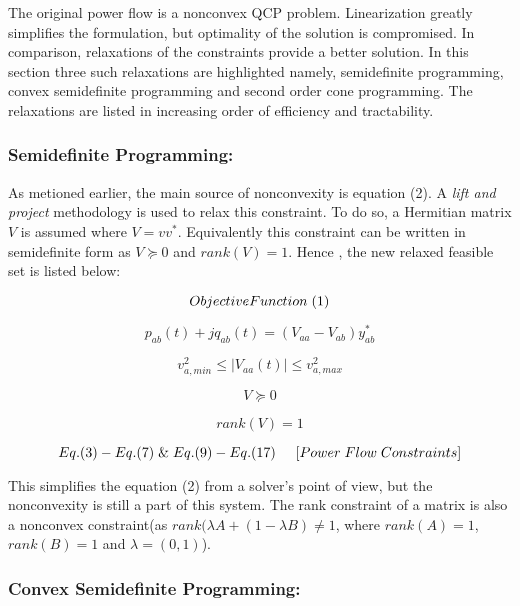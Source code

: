 The original power flow is a nonconvex QCP problem. Linearization greatly simplifies the formulation, but optimality of the solution is compromised. In comparison, relaxations of the constraints provide a better solution. In this section three such relaxations are highlighted namely, semidefinite programming, convex semidefinite programming and second order cone programming. The relaxations are listed in increasing order of efficiency and tractability. 

\subsubsection{Semidefinite Programming:}

As metioned earlier, the main source of nonconvexity is equation (2). A \textit{lift and project} methodology is used to relax this constraint. To do so, a Hermitian matrix $V$ is assumed where $V=vv^\ast$. Equivalently this constraint can be written in semidefinite form as $V\succeq0$ and $rank(V)=1$. Hence , the new relaxed feasible set is listed below:

\begin{tcolorbox}[colback=gray!5!white,colframe=gray!25!black,title=Feasible Set 4 (Nonconvex Semidefinite Power Flow):]
\[
Objective Function\hspace{0.1cm}(1)
\]

\[
  p_{ab}(t) + jq_{ab}(t)= \left ( V_{aa} - V_{ab} \right )y_{ab}^\ast
\]

\[
  v_{a,min}^2\leq \left |V_{aa}(t) \right | \leq v_{a,max}^2  
\]

\[
    V\succeq0
\]

\[
    rank(V)=1
\]


\[
Eq.(3) - Eq.(7)\hspace{0.1cm} \&\hspace{0.1cm} Eq.(9) - Eq.(17) \hspace{0.5cm} [Power \hspace{0.1cm} Flow \hspace{0.1cm}  Constraints] 
\]

\end{tcolorbox}

This simplifies the equation (2) from a solver's point of view, but the nonconvexity is still a part of this system. The rank constraint of a matrix is also a nonconvex constraint(as $rank(\lambda A + (1-\lambda B) \neq 1$, where  $rank(A) =1$, $rank(B) = 1$ and $\lambda=(0,1)$).
\subsubsection{Convex Semidefinite Programming:}

